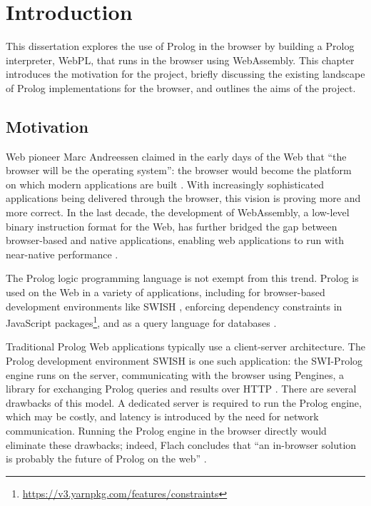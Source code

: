 \chapter{Introduction}

This dissertation explores the use of Prolog in the browser by building a Prolog interpreter, WebPL, that runs in the browser using WebAssembly. This chapter introduces the motivation for the project, briefly discussing the existing landscape of Prolog implementations for the browser, and outlines the aims of the project.

\section{Motivation}

\label{sec:motivation}

Web pioneer Marc Andreessen claimed in the early days of the Web that ``the browser will be the operating system'': the browser would become the platform on which modern applications are built \cite{kosnerAlwaysEarlyMarc2012}. With increasingly sophisticated applications being delivered through the browser, this vision is proving more and more correct. In the last decade, the development of WebAssembly, a low-level binary instruction format for the Web, has further bridged the gap between browser-based and native applications, enabling web applications to run with near-native performance \cite{haasBringingwebspeed2017}.

The Prolog logic programming language is not exempt from this trend. Prolog is used on the Web in a variety of applications, including for browser-based development environments like SWISH \cite{wielemakerSWISHSWIPrologSharing2015}, enforcing dependency constraints in JavaScript packages\footnote{\url{https://v3.yarnpkg.com/features/constraints}}, and as a query language for databases \cite{wielemakerUsingPrologFundament2007}.

Traditional Prolog Web applications typically use a client-server architecture. The Prolog development environment SWISH is one such application: the SWI-Prolog engine runs on the server, communicating with the browser using Pengines, a library for exchanging Prolog queries and results over HTTP \cite{lagerPenginesWebLogic2014}. There are several drawbacks of this model. A dedicated server is required to run the Prolog engine, which may be costly, and latency is introduced by the need for network communication. Running the Prolog engine in the browser directly would eliminate these drawbacks; indeed, Flach concludes that ``an in-browser solution is probably the future of Prolog on the web'' \cite{flachSimplyLogicalFirst2023}.

